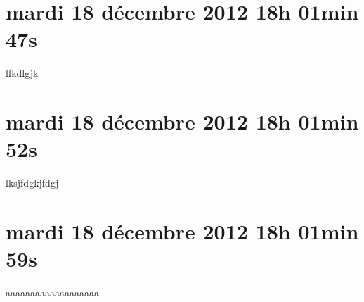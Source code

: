 
\section{mardi 18 décembre 2012 18h 01min 47s}

lfkdlgjk

\section{mardi 18 décembre 2012 18h 01min 52s}

lksjfdgkjfdgj

\section{mardi 18 décembre 2012 18h 01min 59s}

aaaaaaaaaaaaaaaaaaa

